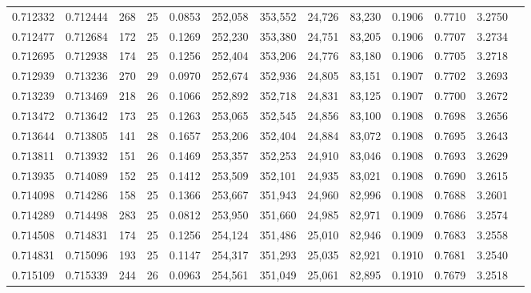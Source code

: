 \begin{tabular}{rrrrrrrrrrrrr}
0.712332 & 0.712444 &   268 &  25 &                                     0.0853 & 252,058 & 353,552 &  24,726 &  83,230 & 0.1906 & 0.7710 & 3.2750 \\
0.712477 & 0.712684 &   172 &  25 &                                     0.1269 & 252,230 & 353,380 &  24,751 &  83,205 & 0.1906 & 0.7707 & 3.2734 \\
0.712695 & 0.712938 &   174 &  25 &                                     0.1256 & 252,404 & 353,206 &  24,776 &  83,180 & 0.1906 & 0.7705 & 3.2718 \\
0.712939 & 0.713236 &   270 &  29 &                                     0.0970 & 252,674 & 352,936 &  24,805 &  83,151 & 0.1907 & 0.7702 & 3.2693 \\
0.713239 & 0.713469 &   218 &  26 &                                     0.1066 & 252,892 & 352,718 &  24,831 &  83,125 & 0.1907 & 0.7700 & 3.2672 \\
0.713472 & 0.713642 &   173 &  25 &                                     0.1263 & 253,065 & 352,545 &  24,856 &  83,100 & 0.1908 & 0.7698 & 3.2656 \\
0.713644 & 0.713805 &   141 &  28 &                                     0.1657 & 253,206 & 352,404 &  24,884 &  83,072 & 0.1908 & 0.7695 & 3.2643 \\
0.713811 & 0.713932 &   151 &  26 &                                     0.1469 & 253,357 & 352,253 &  24,910 &  83,046 & 0.1908 & 0.7693 & 3.2629 \\
0.713935 & 0.714089 &   152 &  25 &                                     0.1412 & 253,509 & 352,101 &  24,935 &  83,021 & 0.1908 & 0.7690 & 3.2615 \\
0.714098 & 0.714286 &   158 &  25 &                                     0.1366 & 253,667 & 351,943 &  24,960 &  82,996 & 0.1908 & 0.7688 & 3.2601 \\
0.714289 & 0.714498 &   283 &  25 &                                     0.0812 & 253,950 & 351,660 &  24,985 &  82,971 & 0.1909 & 0.7686 & 3.2574 \\
0.714508 & 0.714831 &   174 &  25 &                                     0.1256 & 254,124 & 351,486 &  25,010 &  82,946 & 0.1909 & 0.7683 & 3.2558 \\
0.714831 & 0.715096 &   193 &  25 &                                     0.1147 & 254,317 & 351,293 &  25,035 &  82,921 & 0.1910 & 0.7681 & 3.2540 \\
0.715109 & 0.715339 &   244 &  26 &                                     0.0963 & 254,561 & 351,049 &  25,061 &  82,895 & 0.1910 & 0.7679 & 3.2518 \\

\end{tabular}
